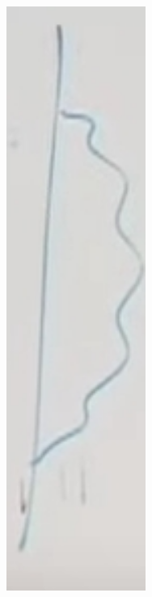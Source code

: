 \documentclass[]{article}
\begin{document}
\begin{figure}[H]
\begin{subfigure}{0.4\textwidth}
		\includegraphics[width=0.5\textwidth]{path-integral-cubic-split1}
	\end{subfigure}
	\begin{subfigure}{0.4\textwidth}

\end{subfigure}
\end{figure}
\end{document}
